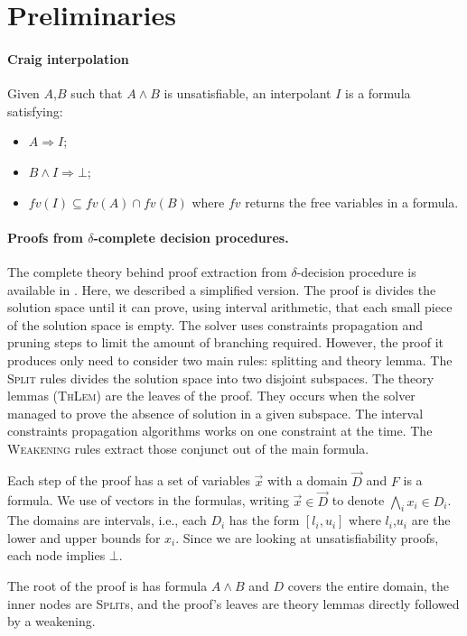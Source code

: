 \section{Preliminaries}
\label{sec:prelim}

\paragraph{Craig interpolation}
Given $A$,$B$ such that $A ∧ B$ is unsatisfiable, an interpolant $I$ is a formula satisfying:
\begin{itemize}
\item $A ⇒ I$;
\item $B ∧ I ⇒ ⊥$;
\item $fv(I) ⊆ fv(A) ∩ fv(B)$ where $fv$ returns the free variables in a formula.
\end{itemize}

\paragraph{Proofs from $\delta$-complete decision procedures.}

The complete theory behind proof extraction from $\delta$-decision procedure is available in \cite{}.
Here, we described a simplified version.
The proof is divides the solution space until it can prove, using interval arithmetic, that each small piece of the solution space is empty.
The solver uses constraints propagation and pruning steps to limit the amount of branching required.
However, the proof it produces only need to consider two main rules: splitting and theory lemma.
The \textsc{Split} rules divides the solution space into two disjoint subspaces.
The theory lemmas (\textsc{ThLem}) are the leaves of the proof.
They occurs when the solver managed to prove the absence of solution in a given subspace.
The interval constraints propagation algorithms works on one constraint at the time. 
The \textsc{Weakening} rules extract those conjunct out of the main formula.

Each step of the proof has a set of variables $\vec x$ with a domain $\vec D$ and $F$ is a formula.
We use of vectors in the formulas, writing $\vec x ∈ \vec D$ to denote $\bigwedge_i x_i ∈ D_i$.
The domains are intervals, i.e., each $D_i$ has the form $[l_i,u_i]$ where $l_i$,$u_i$ are the lower and upper bounds for $x_i$.
Since we are looking at unsatisfiability proofs, each node implies $⊥$.

The root of the proof is has formula $A ∧ B$ and $D$ covers the entire domain,
the inner nodes are \textsc{Split}s,
and the proof's leaves are theory lemmas directly followed by a weakening.

